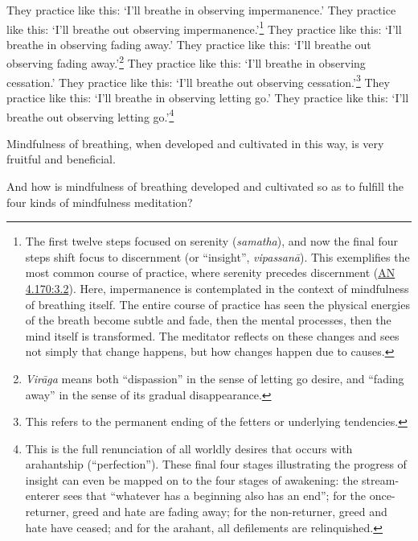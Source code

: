 \documentclass[12pt,openany]{book}%
\begin{document}
They practice like this: ‘I’ll breathe in observing impermanence.’ They practice like this: ‘I’ll breathe out observing impermanence.’\footnote{The first twelve steps focused on serenity (\textit{samatha}), and now the final four steps shift focus to discernment (or “insight”, \textit{\textsanskrit{vipassanā}}). This exemplifies the most common course of practice, where serenity precedes discernment (\href{https://suttacentral.net/an4.170/en/sujato\#3.2}{AN 4.170:3.2}). Here, impermanence is contemplated in the context of mindfulness of breathing itself. The entire course of practice has seen the physical energies of the breath become subtle and fade, then the mental processes, then the mind itself is transformed. The meditator reflects on these changes and sees not simply that change happens, but how changes happen due to causes. } They practice like this: ‘I’ll breathe in observing fading away.’ They practice like this: ‘I’ll breathe out observing fading away.’\footnote{\textit{\textsanskrit{Virāga}} means both “dispassion” in the sense of letting go desire, and “fading away” in the sense of its gradual disappearance. } They practice like this: ‘I’ll breathe in observing cessation.’ They practice like this: ‘I’ll breathe out observing cessation.’\footnote{This refers to the permanent ending of the fetters or underlying tendencies. } They practice like this: ‘I’ll breathe in observing letting go.’ They practice like this: ‘I’ll breathe out observing letting go.’\footnote{This is the full renunciation of all worldly desires that occurs with arahantship (“perfection”). These final four stages illustrating the progress of insight can even be mapped on to the four stages of awakening: the stream-enterer sees that “whatever has a beginning also has an end”; for the once-returner, greed and hate are fading away; for the non-returner, greed and hate have ceased; and for the arahant, all defilements are relinquished. } 

Mindfulness of breathing, when developed and cultivated in this way, is very fruitful and beneficial. 

And how is mindfulness of breathing developed and cultivated so as to fulfill the four kinds of mindfulness meditation? 
\end{document}
